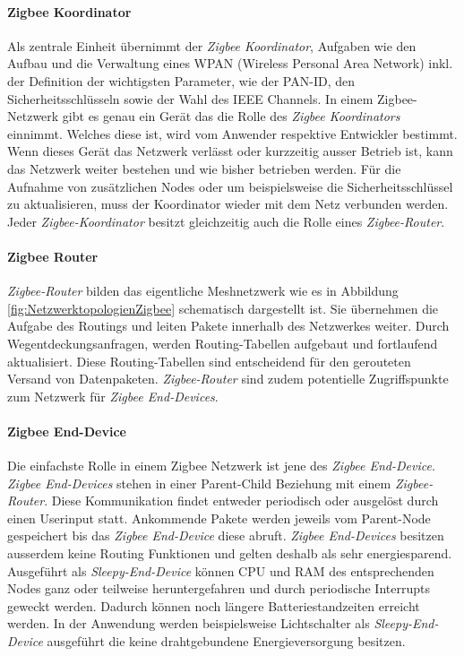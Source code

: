 \paragraph{Zigbee Koordinator}
Als zentrale Einheit übernimmt der \textit{Zigbee Koordinator}, Aufgaben wie den Aufbau und die Verwaltung eines WPAN (Wireless Personal Area Network) inkl. der Definition der wichtigsten Parameter, wie der PAN-ID, den Sicherheitsschlüsseln sowie der Wahl des IEEE Channels.
In einem Zigbee-Netzwerk gibt es genau ein Gerät das die Rolle des \textit{Zigbee Koordinators} einnimmt.
Welches diese ist, wird vom Anwender respektive Entwickler bestimmt.
Wenn dieses Gerät das Netzwerk verlässt oder kurzzeitig ausser Betrieb ist, kann das Netzwerk weiter bestehen und wie bisher betrieben werden.
Für die Aufnahme von zusätzlichen Nodes oder um beispielsweise die Sicherheitsschlüssel zu aktualisieren, muss der Koordinator wieder mit dem Netz verbunden werden.
Jeder \textit{Zigbee-Koordinator} besitzt gleichzeitig auch die Rolle eines \textit{Zigbee-Router}. \cite{markus_krause_rainer_konrad_zigbee_2014}

\paragraph{Zigbee Router}
\textit{Zigbee-Router} bilden das eigentliche Meshnetzwerk wie es in Abbildung \ref{fig:NetzwerktopologienZigbee} schematisch dargestellt ist.
Sie übernehmen die Aufgabe des Routings und leiten Pakete innerhalb des Netzwerkes weiter.
Durch Wegentdeckungsanfragen, werden Routing-Tabellen aufgebaut und fortlaufend aktualisiert.
Diese Routing-Tabellen sind entscheidend für den gerouteten Versand von Datenpaketen.
\textit{Zigbee-Router} sind zudem potentielle Zugriffspunkte zum Netzwerk für \textit{Zigbee End-Devices}. \cite{markus_krause_rainer_konrad_zigbee_2014}

\paragraph{Zigbee End-Device}
Die einfachste Rolle in einem Zigbee Netzwerk ist jene des \textit{Zigbee End-Device}. \textit{Zigbee End-Devices} stehen in einer Parent-Child Beziehung mit einem \textit{Zigbee-Router}.
Diese Kommunikation findet entweder periodisch oder ausgelöst durch einen Userinput statt.
Ankommende Pakete werden jeweils vom Parent-Node gespeichert bis das \textit{Zigbee End-Device} diese abruft.
\textit{Zigbee End-Devices} besitzen ausserdem keine Routing Funktionen und gelten deshalb als sehr energiesparend.
Ausgeführt als \textit{Sleepy-End-Device} können CPU und RAM des entsprechenden Nodes ganz oder teilweise heruntergefahren und durch periodische Interrupts geweckt werden.
Dadurch können noch längere Batteriestandzeiten erreicht werden.
In der Anwendung werden beispielsweise Lichtschalter als \textit{Sleepy-End-Device} ausgeführt die keine draht­ge­bun­dene Energieversorgung besitzen. \cite{markus_krause_rainer_konrad_zigbee_2014}


